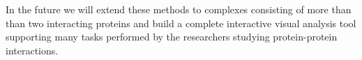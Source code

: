 \documentclass[journal]{vgtc}                %
\begin{document}
In the future we will extend these methods to complexes consisting of more than than two interacting proteins and build a complete interactive visual analysis tool supporting many tasks performed by the researchers studying protein-protein interactions. 


%

%
%
%

\end{document}
